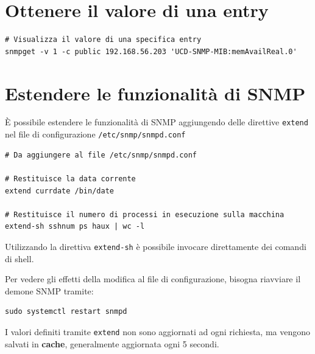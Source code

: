 \documentclass[a4paper]{report}
\newenvironment{ricordati}{\begin{tcolorbox}[fonttitle=\sffamily\bfseries\large,title=Ricordati,colframe=orange!75!white]}{\end{tcolorbox}}
\newenvironment{info}{\begin{tcolorbox}[fonttitle=\sffamily\bfseries\large,title=Info,colframe=blue!75!white]}{\end{tcolorbox}}
\newenvironment{code}{\begin{tcolorbox}[size=small]}{\end{tcolorbox}}
\begin{document}
\section{Ottenere il valore di una entry}

\begin{code}
\begin{lstlisting}
# Visualizza il valore di una specifica entry
snmpget -v 1 -c public 192.168.56.203 'UCD-SNMP-MIB:memAvailReal.0'
\end{lstlisting}
\end{code}

\section{Estendere le funzionalità di SNMP}

È possibile estendere le funzionalità di SNMP aggiungendo delle direttive \texttt{extend} nel file di configurazione \texttt{/etc/snmp/snmpd.conf}

\begin{code}
\begin{lstlisting}
# Da aggiungere al file /etc/snmp/snmpd.conf

# Restituisce la data corrente
extend currdate /bin/date

# Restituisce il numero di processi in esecuzione sulla macchina
extend-sh sshnum ps haux | wc -l
\end{lstlisting}
\end{code}

\begin{info}
	Utilizzando la direttiva \texttt{extend-sh} è possibile invocare direttamente dei comandi di shell.
\end{info}

\begin{ricordati}
	Per vedere gli effetti della modifica al file di configurazione, bisogna riavviare il demone SNMP tramite: 
	
	\begin{lstlisting}
sudo systemctl restart snmpd
	\end{lstlisting}
\end{ricordati}

\begin{ricordati}
	I valori definiti tramite \texttt{extend} non sono aggiornati ad ogni richiesta, ma vengono salvati in \textbf{cache}, generalmente aggiornata ogni 5 secondi.
\end{ricordati}
\end{document}
